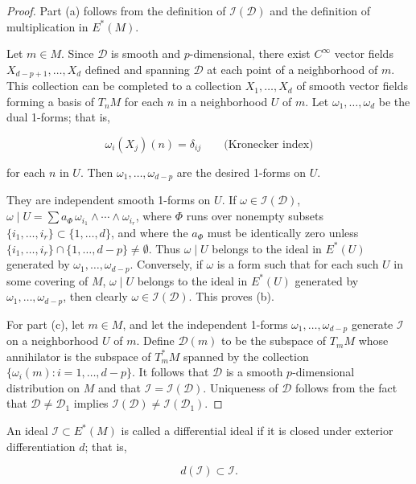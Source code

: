 \begin{proof}
Part (a) follows from the definition of  $ \mathcal{I}(\mathcal{D}) $ and the definition of multiplication in  $ E^{*}(M) $.

Let $m \in M$. Since $\mathcal{D}$ is smooth and $p$-dimensional, there exist $C^\infty$ vector fields $X_{d-p+1},\ldots,X_d$ defined and spanning $\mathcal{D}$ at each point of a neighborhood of $m$. This collection can be completed to a collection $X_1,\ldots,X_d$ of smooth vector fields forming a basis of $T_{n} M$ for each $n$ in a neighborhood $U$ of $m$. Let $\omega_1,\ldots,\omega_d$ be the dual 1-forms; that is,

\[
\omega_{i}(X_{j})(n)=\delta_{i j}\qquad\text{(Kronecker index)}
\]

for each $n$ in $U$. Then $\omega_{1},\ldots,\omega_{d-p}$ are the desired 1-forms on $U$.



They are independent smooth 1-forms on $U$. If $\omega \in \mathcal{I}(\mathcal{D})$, $\omega \mid U = \sum a_{\Phi}\, \omega_{i_{1}} \wedge \cdots \wedge \omega_{i_{r}}$, where $\Phi$ runs over nonempty subsets $\{i_1, \ldots, i_r\} \subset \{1, \ldots, d\}$, and where the $a_{\Phi}$ must be identically zero unless $\{i_1, \ldots, i_r\} \cap \{1, \ldots, d-p\} \neq \emptyset$. Thus $\omega \mid U$ belongs to the ideal in $E^*(U)$ generated by $\omega_{1}, \ldots, \omega_{d-p}$. Conversely, if $\omega$ is a form such that for each such $U$ in some covering of $M$, $\omega \mid U$ belongs to the ideal in $E^*(U)$ generated by $\omega_1, \ldots, \omega_{d-p}$, then clearly $\omega \in \mathcal{I}(\mathcal{D})$. This proves (b).

For part (c), let $m \in M$, and let the independent 1-forms $\omega_1, \ldots, \omega_{d-p}$ generate $\mathcal{I}$ on a neighborhood $U$ of $m$. Define $\mathcal{D}(m)$ to be the subspace of $T_{m} M$ whose annihilator is the subspace of $T_{m}^{*} M$ spanned by the collection $\{\omega_{i}(m): i=1, \ldots, d-p\}$. It follows that $\mathcal{D}$ is a smooth $p$-dimensional distribution on $M$ and that $\mathcal{I} = \mathcal{I}(\mathcal{D})$. Uniqueness of $\mathcal{D}$ follows from the fact that $\mathcal{D} \neq \mathcal{D}_1$ implies $\mathcal{I}(\mathcal{D}) \neq \mathcal{I}(\mathcal{D}_1)$.
\end{proof}

\begin{definition}\label{thm:2.29}
An ideal $\mathcal{I} \subset E^{*}(M)$ is called a differential ideal if it is closed under exterior differentiation $d$; that is,

\begin{equation}
\tag{1}\label{eq:2.29:1}
d(\mathcal{I})\subset\mathcal{I}.
\end{equation}

\end{definition}

